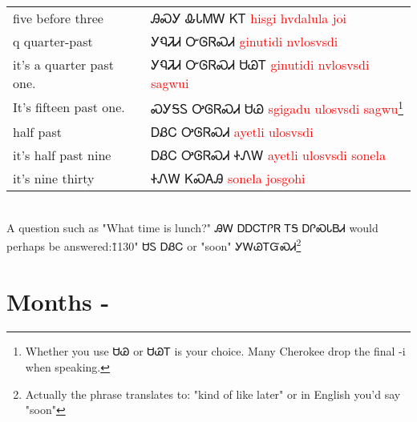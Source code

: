 \begin{multicols}
\cite{feelingHiderGregg202Dpp9}\\
\begin{minipage}{\linewidth}
\begin{tabular}{p{5cm} p{9cm}}
five before three & ᎯᏍᎩ ᎲᏓᎷᎳ ᏦᎢ 
 \newline \textcolor{red}{hisgi hvdalula joi}\\
q quarter-past & ᎩᏄᏘᏗ ᏅᎶᏒᏍᏗ 
 \newline \textcolor{red}{ginutidi nvlosvsdi}\\
it's a quarter past one. & ᎩᏄᏘᏗ ᏅᎶᏒᏍᏗ ᏌᏊᎢ 
 \newline \textcolor{red}{ginutidi nvlosvsdi sagwui}\\
It's fifteen past one. & ᏍᎩᎦᏚ ᎤᎶᏒᏍᏗ ᏌᏊ 
 \newline \textcolor{red}{sgigadu ulosvsdi sagwu}\footnote{Whether you use ᏌᏊ or ᏌᏊᎢ is your choice.  Many Cherokee drop the final -i when speaking.}\\
half past & ᎠᏰᏟ ᎤᎶᏒᏍᏗ 
 \newline \textcolor{red}{ayetli ulosvsdi}\\
it's half past nine & ᎠᏰᏟ ᎤᎶᏒᏍᏗ ᏐᏁᎳ 
 \newline \textcolor{red}{ayetli ulosvsdi sonela}\\
it's nine thirty & ᏐᏁᎳ ᏦᏍᎪᎯ 
 \newline \textcolor{red}{sonela josgohi}\\
\end{tabular}
\end{minipage}

\cite{feelingHiderGregg202Dpp9}\\
A question such as "What time is lunch?" ᎯᎳ ᎠᎠᏟᎢᎵᏒ ᎢᎦ ᎠᎵᏍᏓᏴᏗ would perhaps be answered:\"1130" ᏌᏚ ᎠᏰᏟ or "soon" ᎩᎳᏊᎢᏳᏍᏗ\footnote{Actually the phrase translates to: "kind of like later" or in English you'd say "soon"}\cite{feelingHiderGregg202Dpp9}
\index{}
\chapter{Months - }

\end{multicols}
